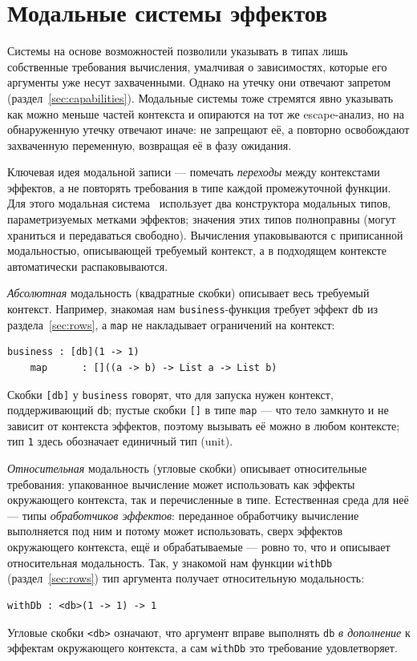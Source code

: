 \documentclass{ProcISPRAS}
\begin{document}
\section{Модальные системы эффектов}
\label{sec:modal}

Системы на основе возможностей позволили указывать в типах лишь собственные
требования вычисления, умалчивая о зависимостях, которые его аргументы уже несут
захваченными. Однако на утечку они отвечают
запретом (раздел~\ref{sec:capabilities}). Модальные системы тоже
стремятся явно указывать как можно меньше частей контекста и опираются на тот же
escape-анализ, но на обнаруженную утечку отвечают иначе: не запрещают её, а повторно
освобождают захваченную переменную, возвращая её в фазу ожидания.

Ключевая идея модальной записи --- помечать \emph{переходы} между контекстами эффектов, а
не повторять требования в типе каждой промежуточной функции. Для этого модальная система~\cite{tang2025modal} использует два конструктора
модальных типов, параметризуемых
метками эффектов; значения этих типов полноправны (могут храниться и передаваться
свободно). Вычисления упаковываются с приписанной модальностью, описывающей требуемый
контекст, а в подходящем контексте автоматически распаковываются.

\emph{Абсолютная} модальность (квадратные скобки) описывает весь требуемый контекст.
Например, знакомая нам \texttt{business}-функция требует эффект \texttt{db} из
раздела~\ref{sec:rows}, а \texttt{map} не накладывает ограничений на контекст:
\begin{lstlisting}[language=modal]
    business : [db](1 -> 1)
    map      : []((a -> b) -> List a -> List b)
\end{lstlisting}
Скобки \texttt{[db]} у \texttt{business} говорят, что для запуска нужен контекст,
поддерживающий \texttt{db}; пустые скобки \texttt{[]} в типе \texttt{map} --- что тело
замкнуто и не зависит от контекста эффектов, поэтому вызывать её можно в любом
контексте; тип \texttt{1} здесь обозначает единичный тип (unit).

\emph{Относительная} модальность (угловые скобки) описывает относительные требования:
упакованное вычисление может использовать как эффекты окружающего контекста, так и
перечисленные в типе. Естественная среда для неё --- типы \emph{обработчиков эффектов}:
переданное обработчику вычисление выполняется под ним и потому может использовать, сверх
эффектов окружающего контекста, ещё и обрабатываемые --- ровно то, что и описывает относительная модальность.
Так, у знакомой нам функции \lstinline|withDb| (раздел~\ref{sec:rows}) тип
аргумента получает относительную модальность:
\begin{lstlisting}[language=modal]
    withDb : <db>(1 -> 1) -> 1
\end{lstlisting}
Угловые скобки \texttt{<db>} означают, что аргумент вправе выполнять \texttt{db}
\emph{в дополнение} к эффектам окружающего контекста, а сам \texttt{withDb} это требование удовлетворяет.
\end{document}

